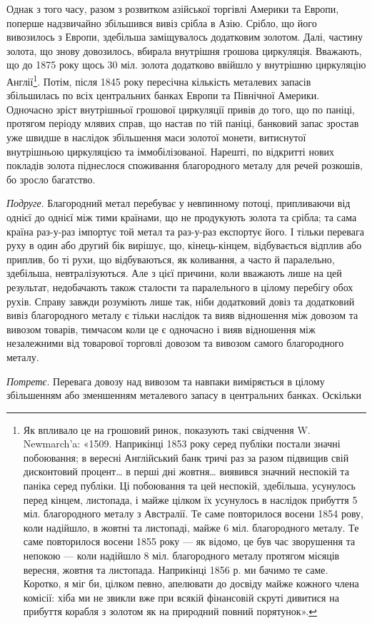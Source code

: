 Однак з того часу, разом з розвитком азійської торгівлі Америки та Европи,
поперше надзвичайно збільшився вивіз срібла в Азію. Срібло, що його вивозилось
з Европи, здебільша заміщувалось додатковим золотом. Далі, частину золота,
що знову довозилось, вбирала внутрішня грошова циркуляція. Вважають, що до
1875 року щось 30 міл. золота додатково ввійшло у внутрішню циркуляцію Англії\footnote{Як впливало це на грошовий ринок, показують такі свідчення W. Newmarch’a: «1509.
Наприкінці 1853 року серед публіки постали значні побоювання; в вересні Англійський банк тричі
раз за разом підвищив свій дисконтовий процент\dots{} в перші дні жовтня\dots{} виявився значний неспокій
та паніка серед публіки. Ці побоювання та цей неспокій, здебільша, усунулось перед кінцем,
листопада, і майже цілком їх усунулось в наслідок прибуття 5 міл. благородного металу з Австралії.
Те саме повторилося восени 1854 рову, коли надійшло, в жовтні та листопаді, майже 6 міл.
благородного металу. Те саме повторилося восени 1855 року — як відомо, це був час зворушення та
непокою — коли надійшло 8 міл. благородного металу протягом місяців вересня, жовтня та листопада.
Наприкінці 1856 р. ми бачимо те саме. Коротко, я міг би, цілком певно, апелювати до досвіду майже
кожного члена комісії: хіба ми не звикли вже при всякій фінансовій скруті дивитися на прибуття
корабля з золотом як на природний повний порятунок».}.
Потім, після 1845 року пересічна кількість металевих запасів збільшилась по всіх
центральних банках Европи та Північної Америки. Одночасно зріст внутрішньої
грошової циркуляції привів до того, що по паніці, протягом періоду млявих
справ, що настав по тій паніці, банковий запас зростав уже швидше в наслідок
збільшення маси золотої монети, витиснутої внутрішньою циркуляцією та іммобілізованої.
Нарешті, по відкритті нових покладів золота піднеслося споживання
благородного металу для речей розкошів, бо зросло багатство.

\emph{Подруге}. Благородний метал перебуває у невпинному потоці, припливаючи
від однієї до однієї між тими країнами, що не продукують золота та
срібла; та сама країна раз-у-раз імпортує той метал та раз-у-раз експортує
його. І тільки перевага руху в один або другий бік вирішує, що, кінець-кінцем,
відбувається відплив або приплив, бо ті рухи, що відбуваються, як коливання,
а часто й паралельно, здебільша, невтралізуються. Але з цієї причини,
коли вважають лише на цей результат, недобачають також сталости та паралельного
в цілому перебігу обох рухів. Справу завжди розуміють лише так, ніби
додатковий довіз та додатковий вивіз благородного металу є тільки наслідок та
вияв відношення між довозом та вивозом товарів, тимчасом коли це є одночасно
і вияв відношення між незалежними від товарової торговлі довозом та вивозом
самого благородного металу.

\emph{Потретє}. Перевага довозу над вивозом та навпаки виміряється в цілому
збільшенням або зменшенням металевого запасу в центральних банках. Оскільки
\parbreak{}  %
